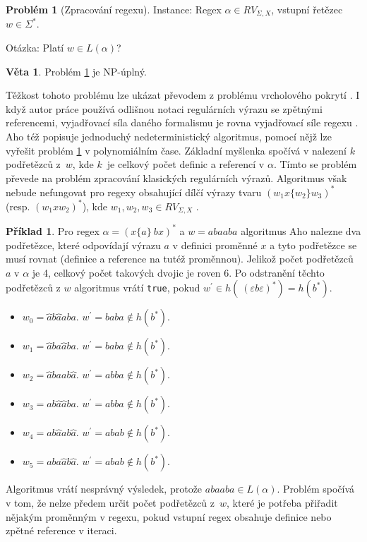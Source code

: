 \documentclass[thesis=B,czech]{FITthesis}[2019/12/23]
\theoremstyle{definition}
\newtheorem{example}{Příklad}[chapter]
\newtheorem{theorem}{Věta}[chapter]
\newtheorem{problem}{Problém}[chapter]
\begin{document}
\begin{problem}[Zpracování regexu]\label{prob}
Instance: Regex $\alpha \in RV_{\Sigma, X}$, vstupní řetězec $w \in \Sigma^\ast$.

Otázka: Platí $w \in L\left(\alpha\right)$?
\end{problem}

\begin{theorem}
Problém \ref{prob} je NP-úplný.
\end{theorem}
Těžkost tohoto problému lze ukázat převodem z problému vrcholového pokrytí \cite[s. 289]{alfred2014algorithms}. I když autor práce používá odlišnou notaci regulárních výrazu se zpětnými referencemi, vyjadřovací síla daného formalismu je rovna vyjadřovací síle regexu \cite[lemma 23 na s. 39]{berglund}. Aho též popisuje jednoduchý nedeterministický algoritmus, pomocí nějž lze vyřešit problém \ref{prob} v polynomiálním čase. Základní myšlenka spočívá v nalezení $k$ podřetězců z~$w$, kde $k$~je celkový počet definic a referencí v $\alpha$. Tímto se problém převede na problém zpracování klasických regulárních výrazů. Algoritmus však nebude nefungovat pro regexy obsahující dílčí výrazy tvaru $\left(w_1 x\{ w_2 \} w_3 \right)^\ast$ (resp. $\left(w_1 x w_2 \right)^\ast$), kde $w_1, w_2, w_3 \in RV_{\Sigma, X}$ \cite[s. 83]{schmidregex}. 
\begin{example}
Pro regex $\alpha=\left(x\{a\} \ b x \right)^\ast$ a $w = abaaba$ algoritmus Aho nalezne dva podřetězce, které odpovídají výrazu $a$ v definici proměnné $x$ a tyto podřetězce se musí rovnat (definice a reference na tutéž proměnnou). Jelikož počet podřetězců $a$ v $\alpha$ je 4, celkový počet takových dvojic je roven 6. Po odstranění těchto podřetězců z $w$ algoritmus vrátí \texttt{true}, pokud $w^\prime \in h( \ (\varepsilon b \varepsilon )^\ast) = h(b^\ast)$.
\begin{itemize}
	\item{$w_0 = \overbrace{a}b\overbrace{a}aba$. $w^\prime = baba \notin h(b^\ast)$. }
	\item{$w_1 =  \overbrace{a}ba \overbrace{a}ba$. $w^\prime = baba \notin h(b^\ast)$. }
	\item{$w_2 =  \overbrace{a}baab \overbrace{a}$. $w^\prime = abba \notin h(b^\ast)$. }
	\item{$w_3 = ab \overbrace{a} \overbrace{a}ba$. $w^\prime = abba \notin h(b^\ast)$.}
	\item{$w_4 = ab \overbrace{a}ab \overbrace{a}$. $w^\prime = abab \notin h(b^\ast)$.}
	\item{$w_5 = aba \overbrace{a}b \overbrace{a}$. $w^\prime = abab \notin h(b^\ast)$.}
\end{itemize} 
Algoritmus vrátí nesprávný výsledek, protože $abaaba \in L(\alpha)$. Problém spočívá v tom, že nelze předem určit počet podřetězců z~$w$, které je potřeba přiřadit nějakým proměnným v regexu, pokud vstupní regex obsahuje definice nebo zpětné reference v iteraci. 
\end{example} 
\end{document}
